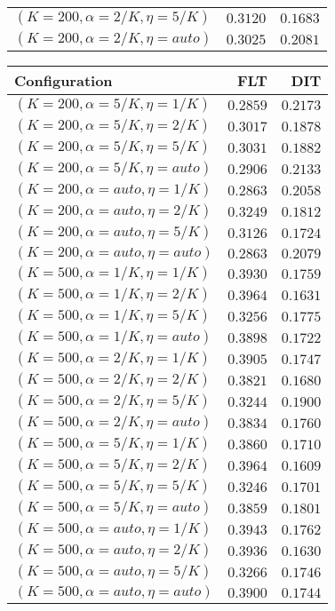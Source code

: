\begin{table}
\begin{spacing}{1.2}
{\begin{tabular}{lrr}
   $(K=200,\alpha=2/K,\eta=5/K)$ & $0.3120$ & $0.1683$ \\
  $(K=200,\alpha=2/K,\eta=auto)$ & $0.3025$ & $0.2081$ \\
\bottomrule
\end{tabular}
} \hfill \parbox{.45\linewidth}{\centering \begin{tabular}{lrr}
\toprule
                   Configuration &           FLT &           DIT \\
\midrule
   $(K=200,\alpha=5/K,\eta=1/K)$ &      $0.2859$ & $\bm{0.2173}$ \\
   $(K=200,\alpha=5/K,\eta=2/K)$ &      $0.3017$ &      $0.1878$ \\
   $(K=200,\alpha=5/K,\eta=5/K)$ &      $0.3031$ &      $0.1882$ \\
  $(K=200,\alpha=5/K,\eta=auto)$ &      $0.2906$ &      $0.2133$ \\
  $(K=200,\alpha=auto,\eta=1/K)$ &      $0.2863$ &      $0.2058$ \\
  $(K=200,\alpha=auto,\eta=2/K)$ &      $0.3249$ &      $0.1812$ \\
  $(K=200,\alpha=auto,\eta=5/K)$ &      $0.3126$ &      $0.1724$ \\
 $(K=200,\alpha=auto,\eta=auto)$ &      $0.2863$ &      $0.2079$ \\
   $(K=500,\alpha=1/K,\eta=1/K)$ &      $0.3930$ &      $0.1759$ \\
   $(K=500,\alpha=1/K,\eta=2/K)$ & $\bm{0.3964}$ &      $0.1631$ \\
   $(K=500,\alpha=1/K,\eta=5/K)$ &      $0.3256$ &      $0.1775$ \\
  $(K=500,\alpha=1/K,\eta=auto)$ &      $0.3898$ &      $0.1722$ \\
   $(K=500,\alpha=2/K,\eta=1/K)$ &      $0.3905$ &      $0.1747$ \\
   $(K=500,\alpha=2/K,\eta=2/K)$ &      $0.3821$ &      $0.1680$ \\
   $(K=500,\alpha=2/K,\eta=5/K)$ &      $0.3244$ &      $0.1900$ \\
  $(K=500,\alpha=2/K,\eta=auto)$ &      $0.3834$ &      $0.1760$ \\
   $(K=500,\alpha=5/K,\eta=1/K)$ &      $0.3860$ &      $0.1710$ \\
   $(K=500,\alpha=5/K,\eta=2/K)$ &      $0.3964$ &      $0.1609$ \\
   $(K=500,\alpha=5/K,\eta=5/K)$ &      $0.3246$ &      $0.1701$ \\
  $(K=500,\alpha=5/K,\eta=auto)$ &      $0.3859$ &      $0.1801$ \\
  $(K=500,\alpha=auto,\eta=1/K)$ &      $0.3943$ &      $0.1762$ \\
  $(K=500,\alpha=auto,\eta=2/K)$ &      $0.3936$ &      $0.1630$ \\
  $(K=500,\alpha=auto,\eta=5/K)$ &      $0.3266$ &      $0.1746$ \\
 $(K=500,\alpha=auto,\eta=auto)$ &      $0.3900$ &      $0.1744$ \\
\bottomrule
\end{tabular}
}
\end{spacing}
\end{table}
